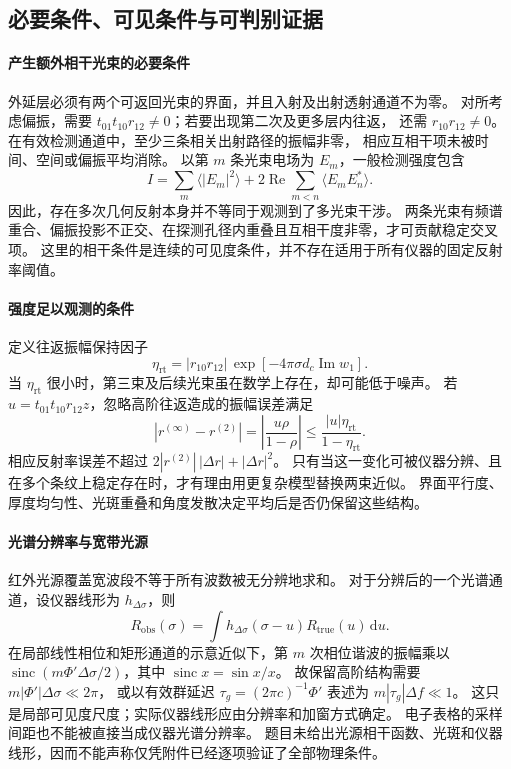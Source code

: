 \subsection{必要条件、可见条件与可判别证据}
\paragraph{产生额外相干光束的必要条件}
外延层必须有两个可返回光束的界面，并且入射及出射透射通道不为零。
对所考虑偏振，需要 $t_{01}t_{10}r_{12}\ne0$；若要出现第二次及更多层内往返，
还需 $r_{10}r_{12}\ne0$。在有效检测通道中，至少三条相关出射路径的振幅非零，
相应互相干项未被时间、空间或偏振平均消除。
以第 $m$ 条光束电场为 $E_m$，一般检测强度包含
\begin{equation}
 I=\sum_m\langle|E_m|^2\rangle+
 2\operatorname{Re}\sum_{m<n}\langle E_mE_n^*\rangle.
 \label{eq:coherence-cross-terms}
\end{equation}
因此，存在多次几何反射本身并不等同于观测到了多光束干涉。
两条光束有频谱重合、偏振投影不正交、在探测孔径内重叠且互相干度非零，才可贡献稳定交叉项。
这里的相干条件是连续的可见度条件，并不存在适用于所有仪器的固定反射率阈值\cite{BornWolf1999}。

\paragraph{强度足以观测的条件}
定义往返振幅保持因子
\begin{equation}
 \eta_{\mathrm{rt}}=|r_{10}r_{12}|\,
 \exp[-4\pi\sigma d_c\operatorname{Im}w_1].
 \label{eq:roundtrip-strength}
\end{equation}
当 $\eta_{\mathrm{rt}}$ 很小时，第三束及后续光束虽在数学上存在，却可能低于噪声。
若 $u=t_{01}t_{10}r_{12}z$，忽略高阶往返造成的振幅误差满足
\begin{equation}
 |r^{(\infty)}-r^{(2)}|
 =\left|\frac{u\rho}{1-\rho}\right|
 \leq\frac{|u|\eta_{\mathrm{rt}}}{1-\eta_{\mathrm{rt}}}.
 \label{eq:two-beam-tail-bound}
\end{equation}
相应反射率误差不超过 $2|r^{(2)}|\,|\Delta r|+|\Delta r|^2$。
只有当这一变化可被仪器分辨、且在多个条纹上稳定存在时，才有理由用更复杂模型替换两束近似。
界面平行度、厚度均匀性、光斑重叠和角度发散决定平均后是否仍保留这些结构。

\paragraph{光谱分辨率与宽带光源}
红外光源覆盖宽波段不等于所有波数被无分辨地求和。
对于分辨后的一个光谱通道，设仪器线形为 $h_{\Delta\sigma}$，则
\begin{equation}
 R_{\mathrm{obs}}(\sigma)=\int h_{\Delta\sigma}(\sigma-u)
 R_{\mathrm{true}}(u)\,\mathrm{d}u.
 \label{eq:instrument-convolution}
\end{equation}
在局部线性相位和矩形通道的示意近似下，第 $m$ 次相位谐波的振幅乘以
$\operatorname{sinc}(m\Phi'\Delta\sigma/2)$，其中 $\operatorname{sinc}x=\sin x/x$。
故保留高阶结构需要 $m|\Phi'|\Delta\sigma\ll2\pi$，
或以有效群延迟 $\tau_g=(2\pi c)^{-1}\Phi'$ 表述为 $m|\tau_g|\Delta f\ll1$。
这只是局部可见度尺度；实际仪器线形应由分辨率和加窗方式确定。
电子表格的采样间距也不能被直接当成仪器光谱分辨率。
题目未给出光源相干函数、光斑和仪器线形，因而不能声称仅凭附件已经逐项验证了全部物理条件。

